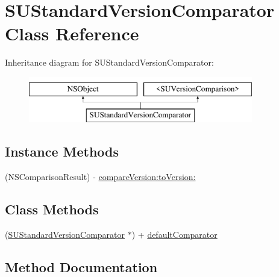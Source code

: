 \hypertarget{interface_s_u_standard_version_comparator}{}\section{S\+U\+Standard\+Version\+Comparator Class Reference}
\label{interface_s_u_standard_version_comparator}
Inheritance diagram for S\+U\+Standard\+Version\+Comparator\+:\begin{figure}[H]
\begin{center}
\leavevmode
\includegraphics[height=2.000000cm]{interface_s_u_standard_version_comparator}
\end{center}
\end{figure}
\subsection*{Instance Methods}
\begin{DoxyCompactItemize}
\item 
(N\+S\+Comparison\+Result) -\/ \mbox{\hyperlink{interface_s_u_standard_version_comparator_a32eac2a727abd9d3c6890f7ac7ca50f1}{compare\+Version\+:to\+Version\+:}}
\end{DoxyCompactItemize}
\subsection*{Class Methods}
\begin{DoxyCompactItemize}
\item 
(\mbox{\hyperlink{interface_s_u_standard_version_comparator}{S\+U\+Standard\+Version\+Comparator}} $\ast$) + \mbox{\hyperlink{interface_s_u_standard_version_comparator_a67be5d5bf36c4774432d912261cb3048}{default\+Comparator}}
\end{DoxyCompactItemize}


\subsection{Method Documentation}
\mbox{\label{interface_s_u_standard_version_comparator_a32eac2a727abd9d3c6890f7ac7ca50f1}} 
